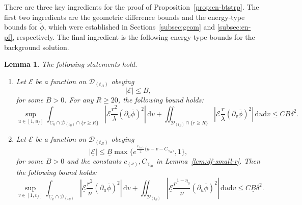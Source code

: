 \documentclass[10pt, reqno]{amsart}
\newtheorem{lemma}[theorem]{Lemma}
\theoremstyle{definition}
\theoremstyle{remark}
\theoremstyle{conjecture}
\numberwithin{equation}{section}
\newcommand{\abs}[1]{\vert#1\vert}
\newcommand{\set}[1]{\{#1\}}
\newcommand{\ud}{\mathrm{d}}
\newcommand{\rd}{\partial}
\newcommand{\0}{\emptyset}
\newcommand{\gmm}{\gamma}
\newcommand{\dlt}{\delta}
\newcommand{\lmb}{\lambda}
\newcommand{\calD}{\mathcal D}
\newcommand{\calE}{\mathcal E}
\newcommand{\uC}{\underline{C}}
\newcommand{\dur}{\nu}
\newcommand{\dvr}{\lmb}
\newcommand{\phibg}{\overline{\phi}}				%
\newcommand{\phidf}{\widetilde{\phi}}				%
\newcommand{\Abs}[1]{\left\vert #1 \right\vert}
\begin{document}
There are three key ingredients for the proof of Proposition~\ref{prop:en-btstrp}. The first two ingredients are the geometric difference bounds and the energy-type bounds for $\phidf$, which were established in Sections~\ref{subsec:geom} and \ref{subsec:en-pf}, respectively.
The final ingredient is the following energy-type bounds for the background solution.
\begin{lemma} \label{lem:en-bg}
The following statements hold.
\begin{enumerate}
\item Let $\calE$ be a function on $\calD_{(t_{B})}$ obeying
\begin{equation*}
	\abs{\calE} \leq B,
\end{equation*}
for some $B > 0$. For any $R \geq 20$, the following bound holds:
\begin{equation} \label{eq:en-bg-dvphi}
	\sup_{u \in [1, u_{f}]} \int_{C_{u} \cap \calD_{(t_{B})} \cap \set{r \geq R}} \Abs{\calE \frac{r^{2}}{\dvr} (\rd_{v} \phibg)^{2}} \, \ud v
	+ \iint_{\calD_{(t_{B})} \cap \set{r \geq R}} \Abs{\calE \frac{r}{\dvr} (\rd_{v} \phibg)^{2} } \, \ud u \ud v
	\leq C B \dlt^{2}.
\end{equation}
\item Let $\underline{\calE}$ be a function on $\calD_{(t_{B})}$ obeying
\begin{equation*}
	\abs{\underline{\calE}} \leq \underline{B} \max \set{e^{\frac{c_{(\dur)}}{2} (u - v- C_{\gmm_{20})}}, 1},
\end{equation*}
for some $\underline{B} > 0$ and the constants $c_{(\dur)}, C_{\gmm_{20}}$ in Lemma~\ref{lem:df-small-r}. Then the following bound holds:
\begin{equation} \label{eq:en-bg-duphi}
	\sup_{v \in [1, v_{f}]} \int_{\uC_{v} \cap \calD_{(t_{B})}} 
					\Abs{ \underline{\calE} \frac{r^{2}}{\dur}(\rd_{u} \phibg)^{2}} \, \ud v
	+ \iint_{\calD_{(t_{B})}} 
					\Abs{ \underline{\calE} \frac{r^{1-\eta_{0}}}{\dur}(\rd_{u} \phibg)^{2}}  \, \ud u \ud v
	\leq C \underline{B} \dlt^{2} .
\end{equation}
\end{enumerate}
\end{lemma}
\end{document}
